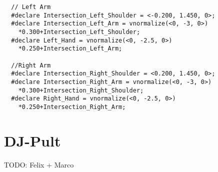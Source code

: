 \documentclass[paper=a4]{scrartcl}
\begin{document}
\begin{lstlisting}
  // Left Arm
  #declare Intersection_Left_Shoulder = <-0.200, 1.450, 0>;
  #declare Intersection_Left_Arm = vnormalize(<0, -3, 0>)
    *0.300+Intersection_Left_Shoulder;
  #declare Left_Hand = vnormalize(<0, -2.5, 0>)
    *0.250+Intersection_Left_Arm;

  //Right Arm
  #declare Intersection_Right_Shoulder = <0.200, 1.450, 0>;
  #declare Intersection_Right_Arm = vnormalize(<0, -3, 0>)
    *0.300+Intersection_Right_Shoulder;
  #declare Right_Hand = vnormalize(<0, -2.5, 0>)
    *0.250+Intersection_Right_Arm;
\end{lstlisting}


\section{DJ-Pult}
TODO: Felix + Marco
\end{document}
